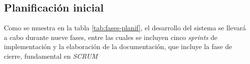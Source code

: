     \subsection{Planificación inicial}
        Como se muestra en la tabla \ref{tab:fases-planif}, el desarrollo del sistema se llevará a cabo durante nueve fases, entre las cuales se incluyen cinco \textit{sprints} de implementación y la elaboración de la documentación, que incluye la fase de cierre, fundamental en \textit{SCRUM}
            
        \begin{table}[h!]             
            \centering                  
            \caption{Planificación de las fases}
            \label{tab:fases-planif}
        \end{table}
        
